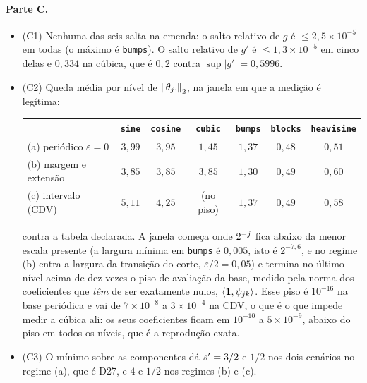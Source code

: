 \documentclass[11pt,a4paper]{article}
\newcommand{\eps}{\varepsilon}
\begin{document}
\paragraph{Parte C.}
\begin{itemize}[leftmargin=*, nosep]
  \item (C1) Nenhuma das seis salta na emenda: o salto relativo de $g$ é
    $\le 2{,}5\times10^{-5}$ em todas (o máximo é \texttt{bumps}). O salto
    relativo de $g'$ é $\le 1{,}3\times10^{-5}$ em cinco delas e
    $0{,}334$ na cúbica, que é $0{,}2$ contra $\sup|g'| = 0{,}5996$.
  \item (C2) Queda média por nível de $\left\lVert \theta_{j\cdot} \right\rVert_{2}$, na
    janela em que a medição é legítima:
    \begin{center}
    \begin{tabular}{lcccccc}
      \toprule
      & \texttt{sine} & \texttt{cosine} & \texttt{cubic} & \texttt{bumps} & \texttt{blocks} & \texttt{heavisine} \\
      \midrule
      (a) periódico $\eps = 0$ & $3{,}99$ & $3{,}95$ & $1{,}45$ & $1{,}37$ & $0{,}48$ & $0{,}51$ \\
      (b) margem e extensão    & $3{,}85$ & $3{,}85$ & $3{,}85$ & $1{,}30$ & $0{,}49$ & $0{,}60$ \\
      (c) intervalo (CDV)      & $5{,}11$ & $4{,}25$ & (no piso) & $1{,}37$ & $0{,}49$ & $0{,}58$ \\
      \bottomrule
    \end{tabular}
    \end{center}
    contra a tabela declarada. A janela começa onde $2^{-j}$ fica abaixo da
    menor escala presente (a largura mínima em \texttt{bumps} é $0{,}005$,
    isto é $2^{-7{,}6}$, e no regime (b) entra a largura da transição do corte,
    $\eps/2 = 0{,}05$) e termina no último nível acima de dez vezes o piso de
    avaliação da base, medido pela norma dos coeficientes que \emph{têm} de
    ser exatamente nulos, $\langle \mathbf{1}, \psi_{jk} \rangle$. Esse piso é
    $10^{-16}$ na base periódica e vai de $7\times10^{-8}$ a
    $3\times10^{-4}$ na CDV, o que é o que impede medir a cúbica ali: os seus
    coeficientes ficam em $10^{-10}$ a $5\times10^{-9}$, abaixo do piso em
    todos os níveis, que é a reprodução exata.
  \item (C3) O mínimo sobre as componentes dá $s' = 3/2$ e $1/2$ nos dois
    cenários no regime (a), que é D27, e $4$ e $1/2$ nos regimes (b) e (c).
\end{itemize}
\end{document}
